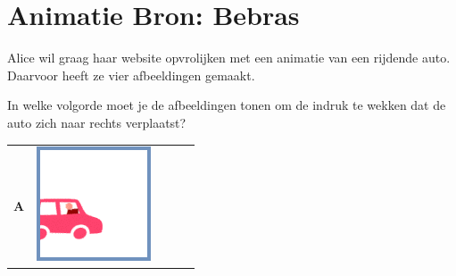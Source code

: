\documentclass[12pt, a4paper]{article}
\begin{document}
	\begin{minipage}{\textwidth}
		\section{Animatie \hfill\small Bron: Bebras}
		Alice wil graag haar website opvrolijken met een animatie van een rijdende auto. Daarvoor heeft ze vier afbeeldingen gemaakt.
		
		In welke volgorde moet je de afbeeldingen tonen om de indruk te wekken dat de auto zich naar rechts verplaatst? 
		
		\begin{table}[H]
			\begin{tabulary}{\linewidth}{|C|CCCC|}
				\hline 
				\textbf{A} & 
				\vspace{0.01cm}\includegraphics[width=\linewidth]{option1} &

\end{tabulary}
\end{table}
\end{minipage}
\end{document}
